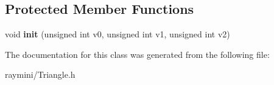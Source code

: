 \subsection*{Protected Member Functions}
\begin{DoxyCompactItemize}
\item 
\hypertarget{class_triangle_a2f86c57f50a7d9f0678485ba38a8063c}{
void {\bfseries init} (unsigned int v0, unsigned int v1, unsigned int v2)}
\label{class_triangle_a2f86c57f50a7d9f0678485ba38a8063c}

\end{DoxyCompactItemize}


The documentation for this class was generated from the following file:\begin{DoxyCompactItemize}
\item 
raymini/Triangle.h\end{DoxyCompactItemize}

